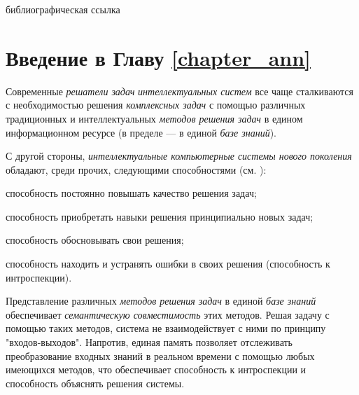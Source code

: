 \begin{SCn}
	\bigskip

	\begin{scnrelfromlist}{библиографическая ссылка}
	\end{scnrelfromlist}

\end{SCn}

\section*{Введение в Главу \ref{chapter_ann}}

Современные \textit{решатели задач} \textit{интеллектуальных систем} все чаще сталкиваются с необходимостью решения \textit{комплексных задач} с помощью различных традиционных и интеллектуальных \textit{методов решения задач} в едином информационном ресурсе (в пределе --- в единой \textit{базе знаний}).

С другой стороны, \textit{интеллектуальные компьютерные системы нового поколения} обладают, среди прочих, следующими способностями (см. ):
\begin{textitemize}
	\item способность постоянно повышать качество решения задач;
	\item способность приобретать навыки решения принципиально новых задач;
	\item способность обосновывать свои решения;
	\item способность находить и устранять ошибки в своих решения (способность к интроспекции).
\end{textitemize}

Представление различных \textit{методов решения задач} в единой \textit{базе знаний} обеспечивает \textit{семантическую совместимость} этих методов. Решая задачу с помощью таких методов, система не взаимодействует с ними по принципу "входов-выходов"{}. Напротив, единая память позволяет отслеживать преобразование входных знаний в реальном времени с помощью любых имеющихся методов, что обеспечивает способность к интроспекции и способность объяснять решения системы.

